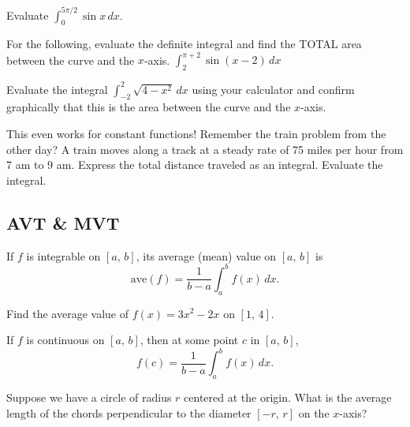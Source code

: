 \documentclass[addpoints, 12pt]{exam}
\begin{document}
\begin{questions}
    \question Evaluate $\displaystyle\int_0^{5\pi/2}\sin x\,dx$.
    
    For the following, evaluate the definite integral and find the TOTAL area between the curve and the $x$-axis.
    \question $\displaystyle\int_2^{\pi+2}\sin(x-2)\,dx$
    
    \question Evaluate the integral $\displaystyle\int_{-2}^{2}\sqrt{4-x^2}\,dx$ using your calculator and confirm graphically that this is the area between the curve and the $x$-axis.
    
    This even works for constant functions! Remember the train problem from the other day? A train moves along a track at a steady rate of 75 miles per hour from 7 am to 9 am. Express the total distance traveled as an integral. Evaluate the integral.
\end{questions}



\newpage
{}
\subsection*{AVT \& MVT}
\begin{tcolorbox}[title= AVERAGE VALUE OF A FUNCTION, black,sharp corners,colback=white,colbacktitle=white,coltitle=black,boxrule=1pt]

     If $f$ is integrable on $[a,\,b]$, its average (mean) value on $[a,\,b]$ is
     \[\text{ave}(f)=\frac{1}{b-a}\int_a^b f(x)\,dx.\]
    
\end{tcolorbox}
\begin{questions}
    \question Find the average value of $f(x)=3x^2-2x$ on $[1,\,4]$.
\end{questions}

\begin{tcolorbox}[title= THE MEAN VALUE THEOREM FOR DEFINITE INTEGRALS, black,sharp corners,colback=white,colbacktitle=white,coltitle=black,boxrule=1pt]

     If $f$ is continuous on $[a,\,b]$, then at some point $c$ in $[a,\,b]$,
     \[f(c)=\frac{1}{b-a}\int_a^b f(x)\,dx.\]
    
\end{tcolorbox}
\begin{questions}
    \setcounter{question}{1}
    \question Suppose we have a circle of radius $r$ centered at the origin. What is the average length of the chords perpendicular to the diameter $[-r,\,r]$ on the $x$-axis?
\end{questions}
\end{document}
